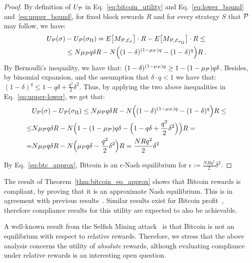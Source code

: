 \begin{proof}
    By definition of $U_{\mathcal{P}}$ in Eq.~\eqref{eq:bitcoin_utility} and Eq.~\eqref{eq:lower_bound} and~\eqref{eq:upper_bound}, for fixed block rewards $R$ and for every strategy $S$ that $\mathcal{P}$ may follow, we have:
\begin{equation}\label{eq:upper-lower}
\begin{split}
    U_{\mathcal{P}}(\sigma)&-U_{\mathcal{P}}(\sigma_\Pi)=E\big[M_{\mathcal{P},\mathcal{E}_\sigma}\big]\cdot R-E\big[M_{\mathcal{P},\mathcal{E}_{\sigma_\Pi}}\big]\cdot R\leq\\
    &\leq N\mu_{\mathcal{P}} q\delta R- N\Big((1-\delta)^{(1-\mu_{\mathcal{P}}) q}-(1-\delta)^q\Big)R\;.
\end{split}
\end{equation}
By Bernoulli's inequality, we have that:
    $(1-\delta)^{(1-\mu_{\mathcal{P}}) q}\geq1-(1-\mu_{\mathcal{P}}) q\delta$.
Besides, by binomial expansion, and the assumption that $\delta\cdot q<1$ we have that:
$(1-\delta)^q\leq1-q\delta+\frac{q^2}{2}\delta^2$.
Thus, by applying the two above inequalities in Eq.~\eqref{eq:upper-lower}, we get that:
\begin{equation}\label{eq:btc_approx}
\begin{split}
    &U_{\mathcal{P}}(\sigma)-U_{\mathcal{P}}(\sigma_\Pi)\leq N\mu_{\mathcal{P}} q\delta R- N\Big((1-\delta)^{(1-\mu_{\mathcal{P}}) q}-(1-\delta)^q\Big)R\leq\\
    \leq&N\mu_{\mathcal{P}} q\delta R- N\Big(1-(1-\mu_{\mathcal{P}}) q\delta-\Big(1-q\delta+\frac{q^2}{2}\delta^2\Big)\Big)R=\\
    =&N\mu_{\mathcal{P}} q\delta R-N\Big(\mu_{\mathcal{P}} q\delta-\frac{q^2}{2}\delta^2\Big)R= \frac{NRq^2}{2}\delta^2
\end{split}
\end{equation}

By Eq.~\eqref{eq:btc_approx}, Bitcoin is an $\epsilon$-Nash equilibrium for $\epsilon:=\frac{NRq^2}{2}\delta^2$.
\end{proof}

The result of Theorem~\ref{thm:bitcoin_eq_approx} shows that Bitcoin \wrt
rewards is compliant, by proving that it is an approximate Nash equilibrium.
This is in agreement with previous
results~\cite{KrollDaveyFeltenWEIS2013,kiayias2019coalitionsafe}. Similar results
exist for Bitcoin \wrt profit~\cite{EC:BGMTZ18,kiayias2019coalitionsafe},
therefore compliance results for this utility are expected to also be achievable.

\begin{remark*}
A well-known result from the Selfish Mining
attack~\cite{FC:EyaSir14,FC:SapSomZoh16} is that Bitcoin is not an equilibrium
with respect to relative rewards. Therefore, we stress that the above analysis
concerns the utility of \emph{absolute} rewards, although evaluating compliance
under relative rewards is an interesting open question.
\end{remark*}
